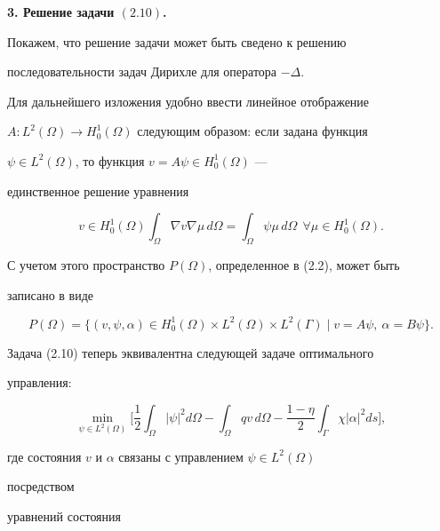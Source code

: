 \addtocounter{section}{1} 


\setcounter{equation}{0} 


 


 


{\bf 3. Решение задачи $(2.10)$.} 


Покажем, что решение задачи может быть сведено к решению 


последовательности задач Дирихле для оператора $-\Delta$. 


 


Для дальнейшего изложения удобно ввести линейное отображение 


$A:L^2(\Omega)\to H^1_0(\Omega)$ следующим образом: если задана функция 


$\psi\in L^2(\Omega)$, то функция $v=A\psi\in H^1_0(\Omega)$ --- 


единственное решение уравнения 


$$ 


v\in H^1_0(\Omega)\int_\Omega \nabla v\nabla\mu\,d\Omega= 


\int_\Omega \psi\mu\,d\Omega\ \ \forall\mu\in H^1_0(\Omega). 


$$ 


С учетом этого пространство $P(\Omega)$, определенное в (2.2), может быть 


записано в виде 


$$ 


P(\Omega)=\{(v,\psi,\alpha)\in H^1_0(\Omega)\times L^2(\Omega)\times 


L^2(\Gamma)\mid v=A\psi,\ \alpha=B\psi\}. 


$$ 


Задача (2.10) теперь эквивалентна следующей задаче оптимального 


управления:


\begin{equation} 


\min_{\psi\in L^2(\Omega)}\bigg[\frac{1}{2}\int_\Omega|\psi|^2 


d\Omega-\int_\Omega qv\,d\Omega-\frac{1-\eta}{2}\int_\Gamma 


\chi|\alpha|^2ds\bigg], 


\end{equation} 


где состояния $v$ и $\alpha$ связаны с управлением $\psi\in L^2(\Omega)$ 


посредством 


уравнений состояния 


